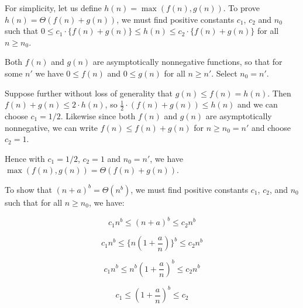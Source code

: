 \documentclass[a4paper,12pt]{article}
\begin{document}

For simplicity, let us define $h(n) = \max(f(n),g(n))$. To prove $h(n) = \Theta(f(n) + g(n))$, we must find positive constants $c_1$, $c_2$ and $n_0$ such that $0 \le c_1\cdot \{f(n) + g(n)\} \le h(n) \le c_2 \cdot \{f(n) + g(n)\}$ for all $n \ge n_0$.

Both $f(n)$ and $g(n)$ are asymptotically nonnegative functions, so that for some $n'$ we have $0 \le f(n)$ and $0 \le g(n)$ for all $n \ge n'$. Select $n_0 = n'$.

Suppose further without loss of generality that $g(n) \le f(n) = h(n)$. Then $f(n) + g(n) \le 2 \cdot h(n)$, so $\frac{1}{2} \cdot \left(f(n) + g(n)\right) \le h(n)$ and we can choose $c_1 = 1/2$. Likewise since both $f(n)$ and $g(n)$ are asymptotically nonnegative, we can write $f(n) \le f(n) + g(n)$ for $n \ge n_0 = n'$ and choose $c_2=1$.

Hence with $c_1 = 1/2$, $c_2 = 1$ and $n_0 = n'$, we have $\max(f(n), g(n)) = \Theta(f(n) + g(n))$.

\vspace{2mm}

To show that $(n+a)^b = \Theta(n^b)$, we must find positive constants $c_1$, $c_2$, and $n_0$ such that for all $n \ge n_0$, we have:

\[ c_1 n^b \le (n+a)^b \le c_2 n^b \]

\[ c_1 n^b \le \{n(1+\frac{a}{n})\}^b \le c_2 n^b \]

\[ c_1 n^b \le  n^b\left(1 + \frac{a}{n}\right)^b \le c_2 n^b \]

\[ c_1 \le \left(1 + \frac{a}{n}\right)^b \le c_2 \]
\end{document}
